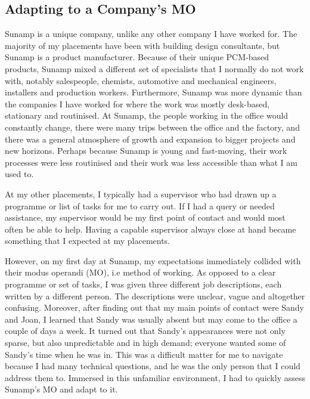 
\subsection{Adapting to a Company's MO}

Sunamp is a unique company, unlike any other company I have worked for.
The majority of my placements have been with building design consultants, but Sunamp is a product manufacturer.
Because of their unique PCM-based products, Sunamp mixed a different set of specialists that I normally do not work with, notably salespeople, chemists, automotive and mechanical engineers, installers and production workers.
Furthermore, Sunamp was more dynamic than the companies I have worked for where the work was mostly desk-based, stationary and routinised.
At Sunamp, the people working in the office would constantly change, there were many trips between the office and the factory, and there was a general atmosphere of growth and expansion to bigger projects and new horizons.
Perhaps because Sunamp is young and fast-moving, their work processes were less routinised and their work was less accessible than what I am used to.

At my other placements, I typically had a supervisor who had drawn up a programme or list of tasks for me to carry out.
If I had a query or needed assistance, my supervisor would be my first point of contact and would most often be able to help.
Having a capable supervisor always close at hand became something that I expected at my placements.


However, on my first day at Sunamp, my expectations immediately collided with their modus operandi (MO), i.e method of working.
As opposed to a clear programme or set of tasks, I was given three different job descriptions, each written by a different person.
The descriptions were unclear, vague and altogether confusing.
Moreover, after finding out that my main points of contact were Sandy and Joan, I learned that Sandy was usually absent but may come to the office a couple of days a week.
It turned out that Sandy's appearances were not only sparse, but also unpredictable and in high demand; everyone wanted some of Sandy's time when he was in.
This was a difficult matter for me to navigate because I had many technical questions, and he was the only person that I could address them to.
Immersed in this unfamiliar environment, I had to quickly assess Sunamp's MO and adapt to it.

